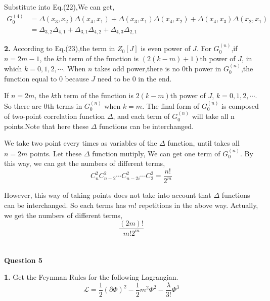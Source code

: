 \documentclass[a4paper]{article}
\begin{document}
\par Substitute into Eq.(22),We can get,
\begin{equation}
    \begin{split}
        G_{0}^{(4)}&=\Delta(x_{3},x_{2})\Delta(x_{4},x_{1})+\Delta(x_{3},x_{1})\Delta(x_{4},x_{2})+\Delta(x_{4},x_{3})\Delta(x_{2},x_{1})\\
        &=\Delta_{3,2}\Delta_{4,1}+\Delta_{3,1}\Delta_{4,2}+\Delta_{4,3}\Delta_{2,1}
    \end{split}
\end{equation}
\par \textbf{2.} According to Eq.(23),the term in $Z_{0}[J]$ is even power of $J$. For $G_{0}^{(n)}$,if $n=2m-1$, the $k$th term of the function is $(2(k-m)+1)$th power of $J$, in which $k=0,1,2,\cdots$. When $n$ takes odd power,there is no 0th power in $G_{0}^{(n)}$,the function equal to 0 because $J$ need to be 0 in the end.
\par If $n=2m$, the $k$th term of the function is $2(k-m)$th power of $J$, $k=0,1,2,\cdots$. So there are 0th terms in $G_{0}^{(n)}$ when $k=m$. The final form of $G_{0}^{(n)}$ is composed of two-point correlation function $\Delta$, and each term of $G_{0}^{(n)}$ will take all n points.Note that here these $\Delta$ functions can be interchanged.
\par We take two point every times as variables of the $\Delta$ function, until takes all $n=2m$ points. Let these $\Delta$ function mutiply, We can get one term of $G_{0}^{(n)}$. By this way, we can get the numbers of different terms,
\begin{equation}
    C_{n}^2 C_{n-2}^2\cdots C_{n-2i}^2 \cdots C_{2}^2=\frac{n!}{2^m}
\end{equation}
\par However, this way of taking points does not take into account that $\Delta$ functions can be interchanged. So each terms has $m!$ repetitions in the above way. Actually, we get the numbers of different terms,
\begin{equation}
    \frac{(2m)!}{m!2^m}
\end{equation}
\\
\\
\noindent \textbf{Question 5}
\par \textbf{1.} Get the Feynman Rules for the following Lagrangian.
\begin{equation}
    \mathcal{L}=\frac{1}{2}(\partial\Phi)^2-\frac{1}{2}m^2\Phi^2-\frac{\lambda}{3!}\Phi^3
\end{equation}
\end{document}
